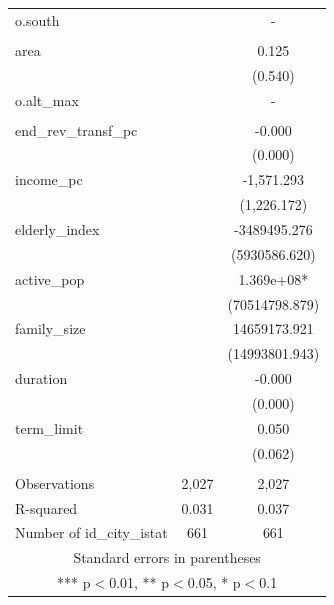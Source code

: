 \documentclass[]{article}
\begin{document}
\begin{tabular}{lcc}
o.south &  & - \\
 &  &  \\
area &  & 0.125 \\
 &  & (0.540) \\
o.alt\_max &  & - \\
 &  &  \\
end\_rev\_transf\_pc &  & -0.000 \\
 &  & (0.000) \\
income\_pc &  & -1,571.293 \\
 &  & (1,226.172) \\
elderly\_index &  & -3489495.276 \\
 &  & (5930586.620) \\
active\_pop &  & 1.369e+08* \\
 &  & (70514798.879) \\
family\_size &  & 14659173.921 \\
 &  & (14993801.943) \\
duration &  & -0.000 \\
 &  & (0.000) \\
term\_limit &  & 0.050 \\
 &  & (0.062) \\
 &  &  \\
Observations & 2,027 & 2,027 \\
R-squared & 0.031 & 0.037 \\
 Number of id\_city\_istat & 661 & 661 \\ \hline
\multicolumn{3}{c}{ Standard errors in parentheses} \\
\multicolumn{3}{c}{ *** p$<$0.01, ** p$<$0.05, * p$<$0.1} \\
\end{tabular}
\end{document}
